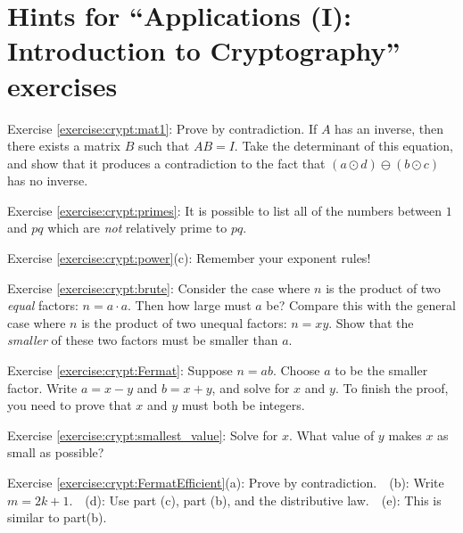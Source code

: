 \section{Hints for ``Applications (I): Introduction to Cryptography'' exercises}
\label{sec:Cryptography:Hints}

\noindent Exercise \ref{exercise:crypt:mat1}: Prove by contradiction.  If $A$ has an inverse, then there exists a matrix $B$ such that $AB = I$.  Take the determinant of this equation, and show that it produces a contradiction to the fact that $(a \odot d)  \ominus (b \odot c)$ has no inverse.

\noindent Exercise \ref{exercise:crypt:primes}: It is possible to list all of the numbers between $1$ and $pq$ which are \emph{not} relatively prime to $pq$.

\noindent Exercise \ref{exercise:crypt:power}(c): Remember your exponent rules!

\noindent Exercise \ref{exercise:crypt:brute}: Consider the case where $n$ is the product of two \emph{equal} factors:  $n=a \cdot a$. Then how large must $a$ be?  Compare this with the general case where $n$ is the product of two unequal factors:  $n = xy$. Show that the \emph{smaller} of these two factors must be smaller than $a$.

\noindent Exercise \ref{exercise:crypt:Fermat}: Suppose $n=ab$. Choose $a$ to be the smaller factor.  Write $a = x-y$ and $b = x+y$, and solve for $x$ and $y$. To finish the proof, you need to prove that $x$ and $y$ must both be integers.

\noindent Exercise \ref{exercise:crypt:smallest_value}: Solve for $x$. What value of $y$ makes $x$ as small as possible?

\noindent Exercise \ref{exercise:crypt:FermatEfficient}(a): Prove by contradiction.~~(b): Write $m = 2k+1$.~~(d): Use part (c), part (b), and the distributive law.~~(e): This is similar to part(b).